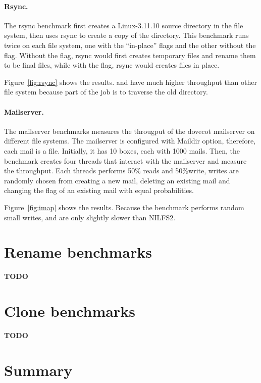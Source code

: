 \paragraph{Rsync.}

The rsync benchmark first creates a Linux-3.11.10 source directory in the file
system, then uses rsync to create a copy of the directory.
This benchmark runs twice on each file system, one with the ``in-place'' flags
and the other without the flag.
Without the flag, rsync would first creates temporary files and rename them to
be final files, while with the flag, rsync would creates files in place.

Figure~\ref{fig:rsync} shows the results.
\betrfsFour and \betrfsFive have much higher throughput than other file system
because part of the job is to traverse the old directory.

\paragraph{Mailserver.}

The mailserver benchmarks measures the througput of the dovecot mailserver on
different file systems.
The mailserver is configured with Maildir option, therefore, each mail is a
file.
Initially, it has 10 boxes, each with 1000 mails.
Then, the benchmark creates four threads that interact with the mailserver and
measure the throughput.
Each threads performs 50\% reads and 50\%write, writes are randomly chosen from
creating a new mail, deleting an existing mail and changing the flag of an
existing mail with equal probabilities.

Figure~\ref{fig:imap} shows the results.
Because the benchmark performs random small writes, \betrfsFour and \betrfsFive
are only slightly slower than NILFS2.

\section{Rename benchmarks}

\textbf{TODO}

\section{Clone benchmarks}

\textbf{TODO}

\section{Summary}
